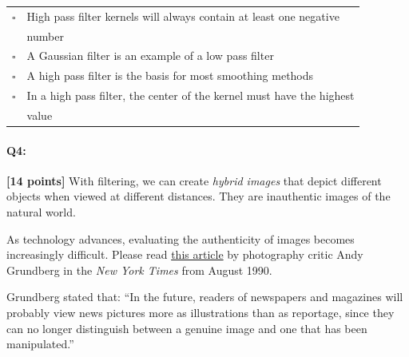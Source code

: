 \documentclass[11pt]{article}
\begin{document}
\begin{enumerate}[(a)]
\begin{tcolorbox}[colback=white!5!white,colframe=green!75!black]
\begin{tabular}[h]{ll}
$\square$ & High pass filter kernels will always contain at least one negative \\
& number \\
$\square$ & A Gaussian filter is an example of a low pass filter \\
$\square$ & A high pass filter is the basis for most smoothing methods \\
$\square$ & In a high pass filter, the center of the kernel must have the highest \\ 
& value \\
\end{tabular}
\end{tcolorbox}

\end{enumerate}


\pagebreak
\paragraph{Q4:} \textbf{[14 points]} With filtering, we can create \emph{hybrid images} that depict different objects when viewed at different distances. They are inauthentic images of the natural world.

As technology advances, evaluating the authenticity of images becomes increasingly difficult. Please read \href{https://www.nytimes.com/1990/08/12/arts/photography-view-ask-it-no-questions-the-camera-can-lie.html}{this article} by photography critic Andy Grundberg in the \emph{New York Times} from August 1990.

Grundberg stated that: ``In the future, readers of newspapers and magazines will probably view news pictures more as illustrations than as reportage, since they can no longer distinguish between a genuine image and one that has been manipulated.''
\end{document}
